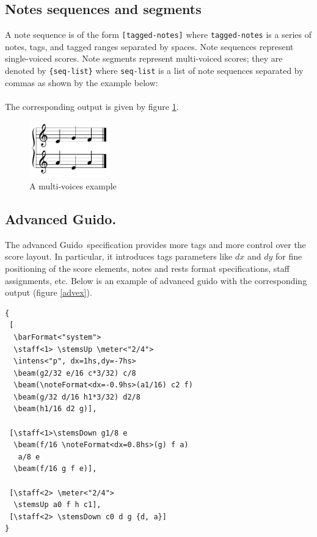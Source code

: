 \documentclass{article}
\newenvironment{gmnsyntax}		{\vspace{-2mm}\small}{\vspace{-2mm}}
\newcommand{\Guido}	{Guido}
\newcommand{\code}[1]	{{\small \texttt{#1}}}
\newcommand{\codeindent}	{\\ \hspace*{9mm}}
\begin{document}
\subsection{Notes sequences and segments}
A note sequence is of the form \verb+[tagged-notes]+ where \code{tagged-notes} is a series of notes, tags, and tagged ranges separated by spaces. Note sequences represent single-voiced scores.
Note segments represent multi-voiced scores; they are denoted by \verb+{seq-list}+ where \code{seq-list} is a list of note sequences separated by commas as shown by the example below:
\codeindent\code{ \{ [ e g f ], [ a e a ] \} } \\
The corresponding output is given by figure \ref{ex1}.

\begin{figure}[h]
	\centering \includegraphics[width=35mm]{rsrc/voices}
 \caption{A multi-voices example}
 \label{ex1}
\end{figure}


\subsection{Advanced \Guido.}
The advanced \Guido\ specification provides more tags and more control over the score layout.
In particular, it introduces tags parameters like $dx$ and $dy$ for fine positioning of the score elements, notes and rests format specifications, staff assignments, etc. 
Below is an example of advanced guido with the corresponding output (figure \ref{advex}).

\begin{gmnsyntax} 
\begin{verbatim} 
{
 [
  \barFormat<"system">
  \staff<1> \stemsUp \meter<"2/4"> 
  \intens<"p", dx=1hs,dy=-7hs>
  \beam(g2/32 e/16 c*3/32) c/8 
  \beam(\noteFormat<dx=-0.9hs>(a1/16) c2 f) 
  \beam(g/32 d/16 h1*3/32) d2/8 
  \beam(h1/16 d2 g)],

 [\staff<1>\stemsDown g1/8 e
  \beam(f/16 \noteFormat<dx=0.8hs>(g) f a) 
   a/8 e 
  \beam(f/16 g f e)],

 [\staff<2> \meter<"2/4"> 
  \stemsUp a0 f h c1],
 [\staff<2> \stemsDown c0 d g {d, a}]
}
\end{verbatim} 
\end{gmnsyntax} 
\end{document}
